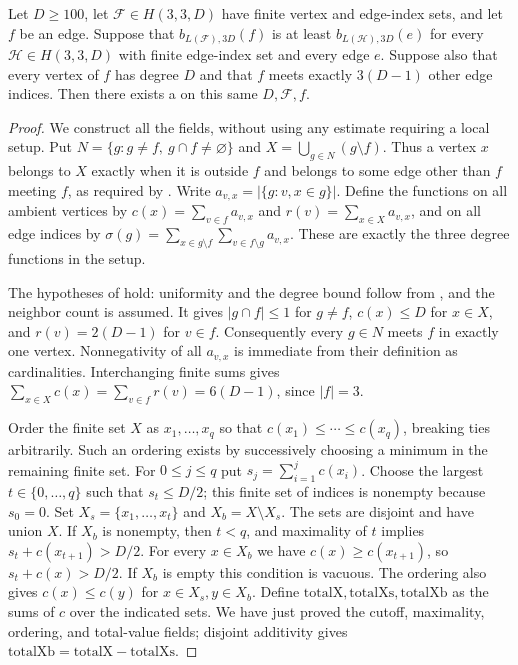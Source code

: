 \begin{lemma}
Let $D\ge100$, let $\mathcal F\in H(3,3,D)$ have finite vertex and
edge-index sets, and let $f$ be an edge. Suppose that
$b_{L(\mathcal F),3D}(f)$ is at least $b_{L(\mathcal H),3D}(e)$ for every
$\mathcal H\in H(3,3,D)$ with finite edge-index set and every edge $e$.
Suppose also that every vertex of $f$ has degree $D$ and that $f$ meets
exactly $3(D-1)$ other edge indices. Then there exists a
 on this same $D,\mathcal F,f$.
\end{lemma}
\begin{proof}
We construct all the fields, without using any estimate requiring a local
setup. Put $N=\{g:g\ne f,\ g\cap f\ne\varnothing\}$ and
$X=\bigcup_{g\in N}(g\setminus f)$. Thus a vertex $x$ belongs to $X$
exactly when it is outside $f$ and belongs to some edge other than $f$
meeting $f$, as required by .
Write $a_{v,x}=|\{g:v,x\in g\}|$. Define the functions on all ambient
vertices by $c(x)=\sum_{v\in f}a_{v,x}$ and
$r(v)=\sum_{x\in X}a_{v,x}$, and on all edge indices by
$\sigma(g)=\sum_{x\in g\setminus f}\sum_{v\in f\setminus g}a_{v,x}$.
These are exactly the three degree functions in the setup.

The hypotheses of  hold:
uniformity and the degree bound follow from
, and the neighbor count is assumed.
It gives $|g\cap f|\le1$ for $g\ne f$, $c(x)\le D$ for $x\in X$,
and $r(v)=2(D-1)$ for $v\in f$. Consequently every $g\in N$ meets $f$
in exactly one vertex. Nonnegativity of all $a_{v,x}$ is immediate from
their definition as cardinalities. Interchanging finite sums gives
$\sum_{x\in X}c(x)=\sum_{v\in f}r(v)=6(D-1)$, since $|f|=3$.

Order the finite set $X$ as $x_1,\ldots,x_q$ so that
$c(x_1)\le\cdots\le c(x_q)$, breaking ties arbitrarily. Such an ordering
exists by successively choosing a minimum in the remaining finite set.
For $0\le j\le q$ put $s_j=\sum_{i=1}^j c(x_i)$. Choose the largest
$t\in\{0,\ldots,q\}$ such that $s_t\le D/2$; this finite set of
indices is nonempty because $s_0=0$. Set
$X_s=\{x_1,\ldots,x_t\}$ and $X_b=X\setminus X_s$.
The sets are disjoint and have union $X$. If $X_b$ is nonempty, then
$t<q$, and maximality of $t$ implies $s_t+c(x_{t+1})>D/2$.
For every $x\in X_b$ we have $c(x)\ge c(x_{t+1})$, so
$s_t+c(x)>D/2$. If $X_b$ is empty this condition is vacuous.
The ordering also gives $c(x)\le c(y)$ for $x\in X_s,y\in X_b$.
Define $\mathrm{totalX},\mathrm{totalXs},\mathrm{totalXb}$ as the sums
of $c$ over the indicated sets. We have just proved the cutoff,
maximality, ordering, and total-value fields; disjoint additivity gives
$\mathrm{totalXb}=\mathrm{totalX}-\mathrm{totalXs}$.


\end{proof}
